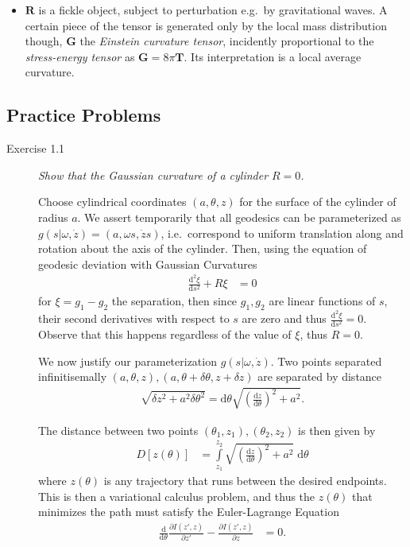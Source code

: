 \documentclass[12pt]{report}
\newcommand{\rd}[2]{\frac{\mathrm{d}#1}{\mathrm{d}#2}}
\newcommand{\pd}[2]{\frac{\partial#1}{\partial#2}}
\newcommand{\rtd}[2]{\frac{\mathrm{d}^2#1}{\mathrm{d}#2^2}}
\begin{document}
\begin{itemize}
    \item $\mathbf{R}$ is a fickle object, subject to perturbation e.g.\ by
        gravitational waves. A certain piece of the tensor is generated only
        by the local mass distribution though, $\mathbf{G}$ the \emph{Einstein
        curvature tensor}, incidently proportional to the \emph{stress-energy
        tensor} as $\mathbf{G} = 8\pi \mathbf{T}$. Its interpretation is a local
        average curvature.
\end{itemize}

\subsection{Practice Problems}

\begin{description}
    \item[Exercise 1.1] \emph{Show that the Gaussian curvature of a cylinder
        $R=0$.}

        Choose cylindrical coordinates $(a, \theta, z)$ for the surface of the
        cylinder of radius $a$. We assert temporarily that all geodesics can be
        parameterized as $g(s|\omega, \dot{z}) = (a, \omega s, \dot{z}s)$, i.e.\
        correspond to uniform translation along and rotation about the axis of
        the cylinder. Then, using the equation of geodesic deviation with
        Gaussian Curvatures
        \begin{align*}
            \rtd{\xi}{s} + R\xi &= 0
        \end{align*}
        for $\xi = g_1 - g_2$ the separation, then since $g_1, g_2$ are linear
        functions of $s$, their second derivatives with respect to $s$ are zero
        and thus $\rtd{\xi}{s} = 0$. Observe that this happens regardless of the
        value of $\xi$, thus $R=0$.

        We now justify our parameterization $g(s|\omega, \dot{z})$. Two points
        separated infinitisemally $(a, \theta, z), (a, \theta + \delta\theta, z
        + \delta z)$ are separated by distance
        \begin{align*}
            \sqrt{\delta z^2 + a^2 \delta \theta^2} =
                \mathrm{d}\theta\sqrt{\left(\rd{z}{\theta}\right)^2 + a^2}.
        \end{align*}

        The distance between two points $(\theta_1, z_1), (\theta_2, z_2)$ is
        then given by
        \begin{align*}
            D[z(\theta)] &= \int\limits_{z_1}^{z_2}
                \sqrt{\left(\rd{z}{\theta}\right)^2 + a^2}\;\mathrm{d}\theta
        \end{align*}
        where $z(\theta)$ is any trajectory that runs between the desired
        endpoints. This is then a variational calculus problem, and thus the
        $z(\theta)$ that minimizes the path must satisfy the Euler-Lagrange
        Equation
        \begin{align*}
            \rd{}{\theta}\pd{I(z', z)}{z'} - \pd{I(z', z)}{z} &= 0.
        \end{align*}


\end{description}
\end{document}
